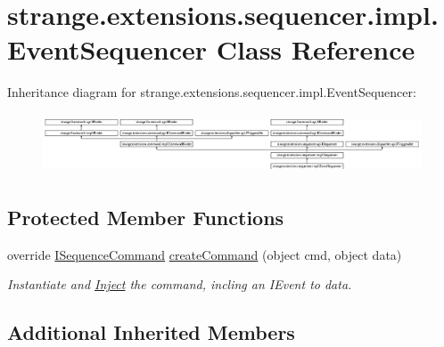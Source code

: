 \hypertarget{classstrange_1_1extensions_1_1sequencer_1_1impl_1_1_event_sequencer}{\section{strange.\-extensions.\-sequencer.\-impl.\-Event\-Sequencer Class Reference}
\label{classstrange_1_1extensions_1_1sequencer_1_1impl_1_1_event_sequencer}
}
Inheritance diagram for strange.\-extensions.\-sequencer.\-impl.\-Event\-Sequencer\-:\begin{figure}[H]
\begin{center}
\leavevmode
\includegraphics[height=1.800643cm]{classstrange_1_1extensions_1_1sequencer_1_1impl_1_1_event_sequencer}
\end{center}
\end{figure}
\subsection*{Protected Member Functions}
\begin{DoxyCompactItemize}
\item 
\hypertarget{classstrange_1_1extensions_1_1sequencer_1_1impl_1_1_event_sequencer_aa6014919e77a8fa52f7177a00e38a07c}{override \hyperlink{interfacestrange_1_1extensions_1_1sequencer_1_1api_1_1_i_sequence_command}{I\-Sequence\-Command} \hyperlink{classstrange_1_1extensions_1_1sequencer_1_1impl_1_1_event_sequencer_aa6014919e77a8fa52f7177a00e38a07c}{create\-Command} (object cmd, object data)}\label{classstrange_1_1extensions_1_1sequencer_1_1impl_1_1_event_sequencer_aa6014919e77a8fa52f7177a00e38a07c}

\begin{DoxyCompactList}\small\item\em Instantiate and \hyperlink{class_inject}{Inject} the command, incling an I\-Event to data. \end{DoxyCompactList}\end{DoxyCompactItemize}
\subsection*{Additional Inherited Members}


